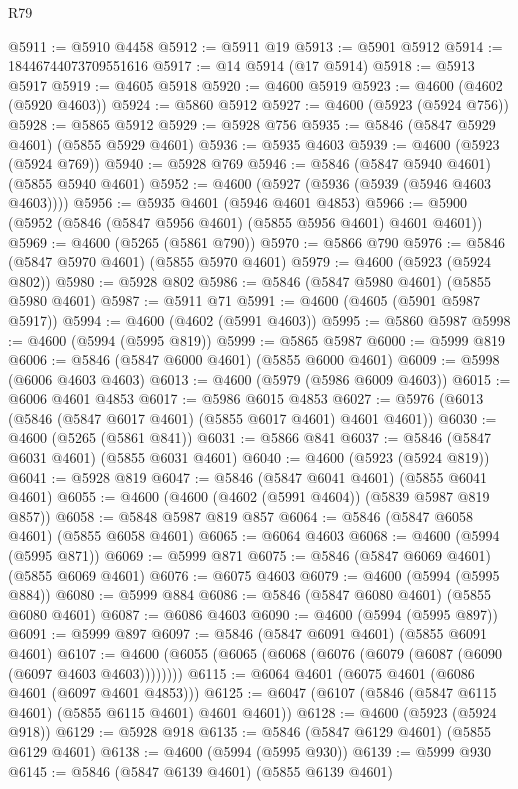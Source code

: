 \begin{lexlean}{R79}
\begin{coremodule}
@5911 := @5910 @4458
@5912 := @5911 @19
@5913 := @5901 @5912
@5914 := 18446744073709551616
@5917 := @14 @5914 (@17 @5914)
@5918 := @5913 @5917
@5919 := @4605 @5918
@5920 := @4600 @5919
@5923 := @4600 (@4602 (@5920 @4603))
@5924 := @5860 @5912
@5927 := @4600 (@5923 (@5924 @756))
@5928 := @5865 @5912
@5929 := @5928 @756
@5935 := @5846 (@5847 @5929 @4601) (@5855 @5929 @4601)
@5936 := @5935 @4603
@5939 := @4600 (@5923 (@5924 @769))
@5940 := @5928 @769
@5946 := @5846 (@5847 @5940 @4601) (@5855 @5940 @4601)
@5952 := @4600 (@5927 (@5936 (@5939 (@5946 @4603 @4603))))
@5956 := @5935 @4601 (@5946 @4601 @4853)
@5966 := @5900 (@5952 (@5846 (@5847 @5956 @4601) (@5855 @5956 @4601) @4601 @4601))
@5969 := @4600 (@5265 (@5861 @790))
@5970 := @5866 @790
@5976 := @5846 (@5847 @5970 @4601) (@5855 @5970 @4601)
@5979 := @4600 (@5923 (@5924 @802))
@5980 := @5928 @802
@5986 := @5846 (@5847 @5980 @4601) (@5855 @5980 @4601)
@5987 := @5911 @71
@5991 := @4600 (@4605 (@5901 @5987 @5917))
@5994 := @4600 (@4602 (@5991 @4603))
@5995 := @5860 @5987
@5998 := @4600 (@5994 (@5995 @819))
@5999 := @5865 @5987
@6000 := @5999 @819
@6006 := @5846 (@5847 @6000 @4601) (@5855 @6000 @4601)
@6009 := @5998 (@6006 @4603 @4603)
@6013 := @4600 (@5979 (@5986 @6009 @4603))
@6015 := @6006 @4601 @4853
@6017 := @5986 @6015 @4853
@6027 := @5976 (@6013 (@5846 (@5847 @6017 @4601) (@5855 @6017 @4601) @4601 @4601))
@6030 := @4600 (@5265 (@5861 @841))
@6031 := @5866 @841
@6037 := @5846 (@5847 @6031 @4601) (@5855 @6031 @4601)
@6040 := @4600 (@5923 (@5924 @819))
@6041 := @5928 @819
@6047 := @5846 (@5847 @6041 @4601) (@5855 @6041 @4601)
@6055 := @4600 (@4600 (@4602 (@5991 @4604)) (@5839 @5987 @819 @857))
@6058 := @5848 @5987 @819 @857
@6064 := @5846 (@5847 @6058 @4601) (@5855 @6058 @4601)
@6065 := @6064 @4603
@6068 := @4600 (@5994 (@5995 @871))
@6069 := @5999 @871
@6075 := @5846 (@5847 @6069 @4601) (@5855 @6069 @4601)
@6076 := @6075 @4603
@6079 := @4600 (@5994 (@5995 @884))
@6080 := @5999 @884
@6086 := @5846 (@5847 @6080 @4601) (@5855 @6080 @4601)
@6087 := @6086 @4603
@6090 := @4600 (@5994 (@5995 @897))
@6091 := @5999 @897
@6097 := @5846 (@5847 @6091 @4601) (@5855 @6091 @4601)
@6107 := @4600 (@6055 (@6065 (@6068 (@6076 (@6079 (@6087 (@6090 (@6097 @4603 @4603))))))))
@6115 := @6064 @4601 (@6075 @4601 (@6086 @4601 (@6097 @4601 @4853)))
@6125 := @6047 (@6107 (@5846 (@5847 @6115 @4601) (@5855 @6115 @4601) @4601 @4601))
@6128 := @4600 (@5923 (@5924 @918))
@6129 := @5928 @918
@6135 := @5846 (@5847 @6129 @4601) (@5855 @6129 @4601)
@6138 := @4600 (@5994 (@5995 @930))
@6139 := @5999 @930
@6145 := @5846 (@5847 @6139 @4601) (@5855 @6139 @4601)

\end{coremodule}
\end{lexlean}
